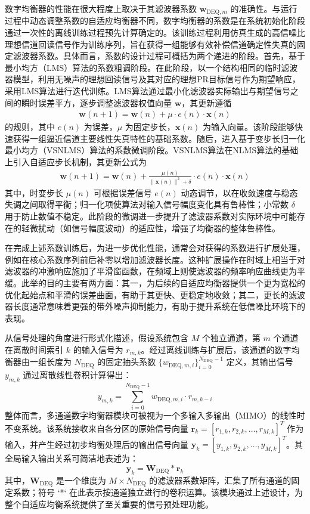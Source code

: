 数字均衡器的性能在很大程度上取决于其滤波器系数 $\mathbf{w}_{\text{DEQ}, m}$ 的准确性。与运行过程中动态调整系数的自适应均衡器不同，数字均衡器的系数是在系统初始化阶段通过一次性的离线训练过程预先计算确定的。该训练过程利用仿真生成的高信噪比理想信道回读信号作为训练序列，旨在获得一组能够有效补偿信道确定性失真的固定滤波器系数。具体而言，系数的设计过程可概括为两个递进的阶段。首先，基于最小均方（LMS）算法的系数粗调阶段。在此阶段，以一个结构相同的临时滤波器模型，利用无噪声的理想回读信号及其对应的理想PR目标信号作为期望响应，采用LMS算法进行迭代训练。LMS算法通过最小化滤波器实际输出与期望信号之间的瞬时误差平方，逐步调整滤波器权值向量 $\mathbf{w}$，其更新遵循
\begin{align}
 	\mathbf{w}(n+1) = \mathbf{w}(n) + \mu \cdot e(n) \cdot \mathbf{x}(n)
\end{align}
 的规则，其中 $e(n)$ 为误差，$\mu$ 为固定步长，$\mathbf{x}(n)$ 为输入向量。该阶段能够快速获得一组逼近信道主要线性失真特性的基础系数。随后，进入基于变步长归一化最小均方（VSNLMS）算法的系数微调阶段。VSNLMS算法在NLMS算法的基础上引入自适应步长机制，其更新公式为 
 \begin{align}
 \mathbf{w}(n+1) = \mathbf{w}(n) + \frac{\mu(n)}{\|\mathbf{x}(n)\|^2 + \delta} \cdot e(n) \cdot \mathbf{x}(n)
\end{align}
 其中，时变步长 $\mu(n)$ 可根据误差信号 $e(n)$ 动态调节，以在收敛速度与稳态失调之间取得平衡；归一化项使算法对输入信号幅度变化具有鲁棒性；小常数 $\delta$ 用于防止数值不稳定。此阶段的微调进一步提升了滤波器系数对实际环境中可能存在的轻微扰动（如信号幅度波动）的适应性，增强了均衡器的整体鲁棒性。

在完成上述系数训练后，为进一步优化性能，通常会对获得的系数进行扩展处理，例如在核心系数序列前后补零以增加滤波器长度。这种扩展操作在时域上相当于对滤波器的冲激响应施加了平滑窗函数，在频域上则使滤波器的频率响应曲线更为平缓。此举的目的主要有两方面：其一，为后续的自适应均衡器提供一个更为宽松的优化起始点和平滑的误差曲面，有助于其更快、更稳定地收敛；其二，更长的滤波器长度通常意味着更强的带外噪声抑制能力，有助于提升系统在低信噪比环境下的表现。

从信号处理的角度进行形式化描述，假设系统包含 $M$ 个独立通道，第 $m$ 个通道在离散时间索引 $k$ 的输入信号为 $r_{m,k}$。经过离线训练与扩展后，该通道的数字均衡器由一组长度为 $N_{\text{DEQ}}$ 的固定抽头系数 $\{w_{\text{DEQ}, m, i}\}_{i=0}^{N_{\text{DEQ}}-1}$ 定义，其输出信号 $y_{m,k}$ 通过离散线性卷积计算得出：
\[
y_{m,k} = \sum_{i=0}^{N_{\text{DEQ}}-1} w_{\text{DEQ}, m, i} \cdot r_{m, k-i}
\]
整体而言，多通道数字均衡器模块可被视为一个多输入多输出（MIMO）的线性时不变系统。该系统接收来自各分区的原始信号向量 $\mathbf{r}_k = [r_{1,k}, r_{2,k}, \ldots, r_{M,k}]^T$ 作为输入，并产生经过初步均衡处理后的输出信号向量 $\mathbf{y}_k = [y_{1,k}, y_{2,k}, \ldots, y_{M,k}]^T$。其全局输入输出关系可简洁地表述为：
\[
\mathbf{y}_k = \mathbf{W}_{\text{DEQ}} * \mathbf{r}_k
\]
其中，$\mathbf{W}_{\text{DEQ}}$ 是一个维度为 $M \times N_{\text{DEQ}}$ 的滤波器系数矩阵，汇集了所有通道的固定系数；符号 `*` 在此表示按通道独立进行的卷积运算。该模块通过上述设计，为整个自适应均衡系统提供了至关重要的信号预处理功能。

